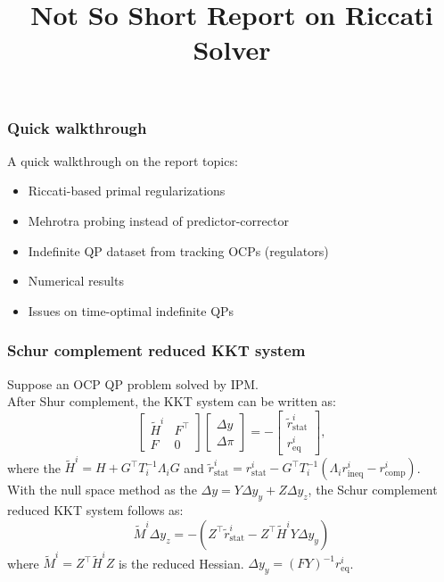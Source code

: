 \documentclass[10pt,aspectratio=1610]{beamer} %
\title[Not So Short Report on Riccati Solver]{\huge Not So Short Report on Riccati Solver}
\begin{document}
\InsertTitle

\begin{frame}
    \frametitle{Quick walkthrough}
    A quick walkthrough on the report topics:
    \begin{itemize}
        \item Riccati-based primal regularizations
        \item Mehrotra probing instead of predictor-corrector
        \item Indefinite QP dataset from tracking OCPs (regulators)
        \item Numerical results
        \item Issues on time-optimal indefinite QPs
    \end{itemize}
\end{frame}

\begin{frame}
    \frametitle{Schur complement reduced KKT system}
    Suppose an OCP QP problem solved by IPM.\\
    After Shur complement, the KKT system can be written as:
    \begin{equation}
        \begin{bmatrix}
        \tilde{H}^i & F^\top \\
        F & 0
        \end{bmatrix}
        \begin{bmatrix}
        \Delta y \\
        \Delta \pi
        \end{bmatrix} = -
        \begin{bmatrix}
        \tilde{r}_{\mathrm{stat}}^i \\
        r_{\mathrm{eq}}^i
        \end{bmatrix},
        \label{eq:schur_comp_KKT}
    \end{equation}
    where the $\tilde{H}^i = H + G^\top T_i^{-1}\Lambda_i G$ 
    and $\tilde{r}_{\mathrm{stat}}^i = r_{\mathrm{stat}}^i - G^\top T_i^{-1} ( \Lambda_i r_{\mathrm{ineq}}^i - r_{\mathrm{comp}}^i )$. \\
    \vspace{0.5cm}
    With the null space method as the $\Delta y = Y\Delta y_y + Z\Delta y_z$, 
    the Schur complement reduced KKT system follows as:
    \begin{equation}
        \tilde{M}^i \Delta y_z = - (Z^\top \tilde{r}_{\mathrm{stat}}^i - Z^\top \tilde{H}^i Y \Delta y_y)
        \label{eq:schur_comp_KKT_reduced}
    \end{equation}
    where $\tilde{M}^i = Z^\top \tilde{H}^i Z$ is the reduced Hessian. $\Delta y_y = (FY)^{-1}r_{\mathrm{eq}}^i$.

\end{frame}
\end{document}
